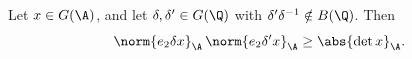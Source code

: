 Let $x\in G(\A)$, and let $\delta,\delta'\in G(\Q)$ with $\delta'\delta^{-1}\notin B(\Q)$. Then
\[
  \norm{e_2\delta x}_\A\,\norm{e_2\delta'x}_\A\ge\abs{\det x}_\A.
\]
